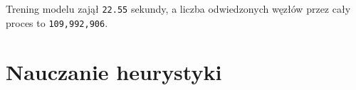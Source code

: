 \documentclass[a4paper,12pt]{article}
\begin{document}
    Trening modelu zajął \texttt{22.55} sekundy, a liczba odwiedzonych węzłów przez cały proces to \texttt{109,992,906}.

\section{Nauczanie heurystyki}


\end{document}
